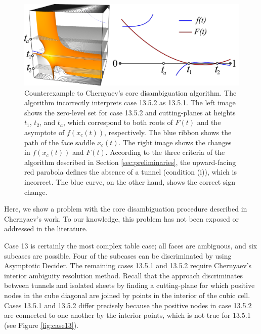 \begin{figure}[t]
     \centering
     \includegraphics[width=1\linewidth]{chapter4/data/counter_example/graph.png}
     \caption{Counterexample to Chernyaev's core disambiguation algorithm. The \mc{} algorithm incorrectly interprets case 13.5.2 as 13.5.1. The left image shows the zero-level set for case 13.5.2 and cutting-planes at heights $t_1$, $t_2$, and $t_a$, which correspond to both roots of $F(t)$ and the asymptote of $f(x_c(t))$, respectively. The blue ribbon shows the path of the face saddle $x_c(t)$. The right image shows the changes in $f(x_c(t))$ and $F(t)$. According to the three criteria of the \mc{} algorithm described in Section \ref{sec:preliminaries},  the upward-facing red parabola defines the absence of a tunnel (condition (i)), which is incorrect. The blue curve, on the other hand, shows the correct sign change.}
     \label{fig:case13counter_example}
\end{figure}

Here, we show a problem with the core disambiguation procedure described in Chernyaev's work. To our knowledge, this problem has not been exposed or addressed in the literature.

Case 13 is certainly the most complex table case; all faces are ambiguous, and six subcases are possible. Four of the subcases can be discriminated by using Asymptotic Decider. The remaining cases 13.5.1 and 13.5.2 require Chernyaev's \mc{} interior ambiguity resolution method.
%
Recall that the \mc{} approach discriminates between tunnels and isolated sheets by finding a cutting-plane for which positive nodes in the cube diagonal are joined by points in the interior of the cubic cell. 
Cases 13.5.1 and 13.5.2 differ precisely because the positive nodes in case 13.5.2 are connected to one another by the interior points, which is not true for 13.5.1 (see Figure \ref{fig:case13}).

